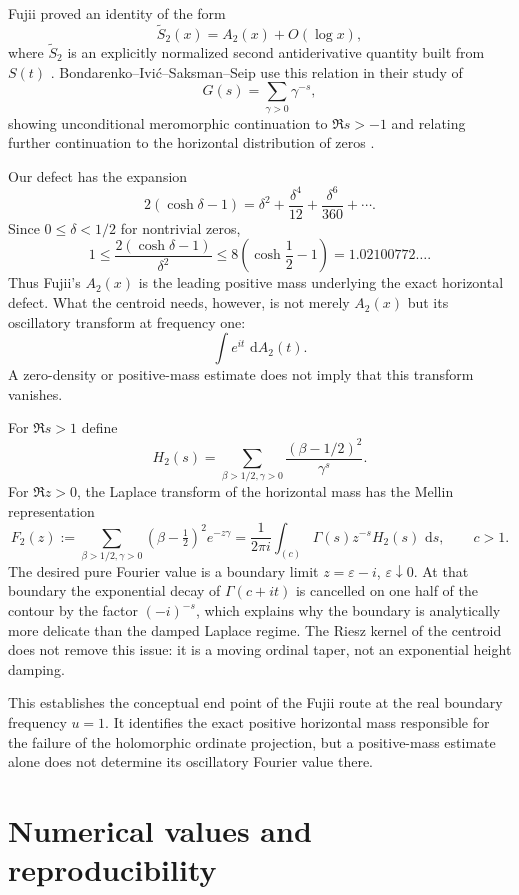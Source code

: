 \documentclass[11pt]{amsart}
\numberwithin{equation}{section}
\theoremstyle{definition}
\theoremstyle{remark}
\newcommand{\dd}{\,\mathrm d}
\begin{document}
Fujii proved an identity of the form
\begin{equation}\label{eq:Fujii}
\widetilde S_2(x)=A_2(x)+O(\log x),
\end{equation}
where $\widetilde S_2$ is an explicitly normalized second antiderivative quantity built from $S(t)$ \cite{Fujii2002}. Bondarenko--Ivić--Saksman--Seip use this relation in their study of
\[
G(s)=\sum_{\gamma>0}\gamma^{-s},
\]
showing unconditional meromorphic continuation to $\Re s>-1$ and relating further continuation to the horizontal distribution of zeros \cite{BondarenkoIvicSaksmanSeip2019}.

Our defect has the expansion
\[
2(\cosh\delta-1)
=\delta^2+\frac{\delta^4}{12}+\frac{\delta^6}{360}+\cdots.
\]
Since $0\le\delta<1/2$ for nontrivial zeros,
\[
1\le
\frac{2(\cosh\delta-1)}{\delta^2}
\le 8\left(\cosh\frac12-1\right)
=1.02100772\ldots.
\]
Thus Fujii's $A_2(x)$ is the leading positive mass underlying the exact horizontal defect. What the centroid needs, however, is not merely $A_2(x)$ but its oscillatory transform at frequency one:
\[
\int e^{it}\,\dd A_2(t).
\]
A zero-density or positive-mass estimate does not imply that this transform vanishes.

For $\Re s>1$ define
\[
H_2(s)=\sum_{\beta>1/2,\gamma>0}
\frac{(\beta-1/2)^2}{\gamma^s}.
\]
For $\Re z>0$, the Laplace transform of the horizontal mass has the Mellin representation
\begin{equation}\label{eq:MellinFujii}
F_2(z)
:=\sum_{\beta>1/2,\gamma>0}(\beta-\tfrac12)^2e^{-z\gamma}
=\frac1{2\pi i}\int_{(c)}\Gamma(s)z^{-s}H_2(s)\,\dd s,
\qquad c>1.
\end{equation}
The desired pure Fourier value is a boundary limit $z=\varepsilon-i$, $\varepsilon\downarrow0$. At that boundary the exponential decay of $\Gamma(c+it)$ is cancelled on one half of the contour by the factor $(-i)^{-s}$, which explains why the boundary is analytically more delicate than the damped Laplace regime. The Riesz kernel of the centroid does not remove this issue: it is a moving ordinal taper, not an exponential height damping.

This establishes the conceptual end point of the Fujii route at the real boundary frequency $u=1$. It identifies the exact positive horizontal mass responsible for the failure of the holomorphic ordinate projection, but a positive-mass estimate alone does not determine its oscillatory Fourier value there.

\section{Numerical values and reproducibility}\label{sec:numerics}
\end{document}
